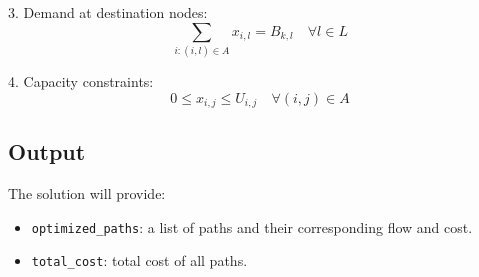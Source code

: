 \documentclass{article}
\begin{document}
3. Demand at destination nodes:
\[
\sum_{i: (i,l) \in A} x_{i,l} = B_{k,l} \quad \forall l \in L
\]

4. Capacity constraints:
\[
0 \leq x_{i,j} \leq U_{i,j} \quad \forall (i,j) \in A
\]

\subsection*{Output}
The solution will provide:
\begin{itemize}
    \item \texttt{optimized\_paths}: a list of paths and their corresponding flow and cost.
    \item \texttt{total\_cost}: total cost of all paths.
\end{itemize}
\end{document}
